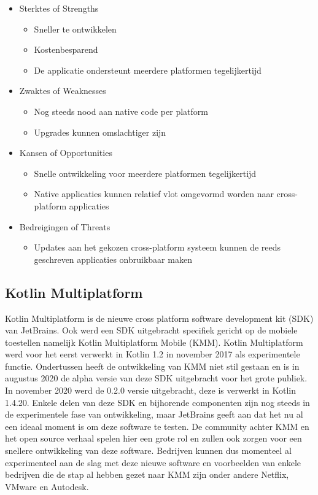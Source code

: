 \begin{itemize}
\item Sterktes of Strengths
\begin{itemize}
\item Sneller te ontwikkelen
\item Kostenbesparend
\item De applicatie ondersteunt meerdere platformen tegelijkertijd
\end{itemize}
\item Zwaktes of Weaknesses
\begin{itemize}
\item Nog steeds nood aan native code per platform
\item Upgrades kunnen omslachtiger zijn
\end{itemize}
\item Kansen of Opportunities
\begin{itemize}
\item Snelle ontwikkeling voor meerdere platformen tegelijkertijd
\item Native applicaties kunnen relatief vlot omgevormd worden naar cross-platform applicaties
\end{itemize}
\item Bedreigingen of Threats
\begin{itemize}
\item Updates aan het gekozen cross-platform systeem kunnen de reeds geschreven applicaties onbruikbaar maken
\end{itemize}
\end{itemize}

\subsection{Kotlin Multiplatform}
\label{sec:kotlin_multiplatform}
Kotlin Multiplatform is de nieuwe cross platform software development kit (SDK) van JetBrains. Ook werd een SDK uitgebracht specifiek gericht op de mobiele toestellen namelijk Kotlin Multiplatform Mobile (KMM). Kotlin Multiplatform werd voor het eerst verwerkt in Kotlin 1.2 in november 2017 als experimentele functie.\autocite{Jemerov2017} 
Ondertussen heeft de ontwikkeling van KMM niet stil gestaan en is in augustus 2020 de alpha versie van deze SDK uitgebracht voor het grote publiek.\autocite{Petrova2020} In november 2020 werd de 0.2.0 versie uitgebracht, deze is verwerkt in Kotlin 1.4.20.\autocite{JetBrains2020} Enkele delen van deze SDK en bijhorende componenten zijn nog steeds in de experimentele fase van ontwikkeling, maar JetBrains geeft aan dat het nu al een ideaal moment is om deze software te testen.\autocite{Petrova2020} De community achter KMM en het open source verhaal spelen hier een grote rol en zullen ook zorgen voor een snellere ontwikkeling van deze software. Bedrijven kunnen dus momenteel al experimenteel aan de slag met deze nieuwe software en voorbeelden van enkele bedrijven die de stap al hebben gezet naar KMM zijn onder andere Netflix, VMware en Autodesk.\autocite{KotlinKMMCaseStudies}


